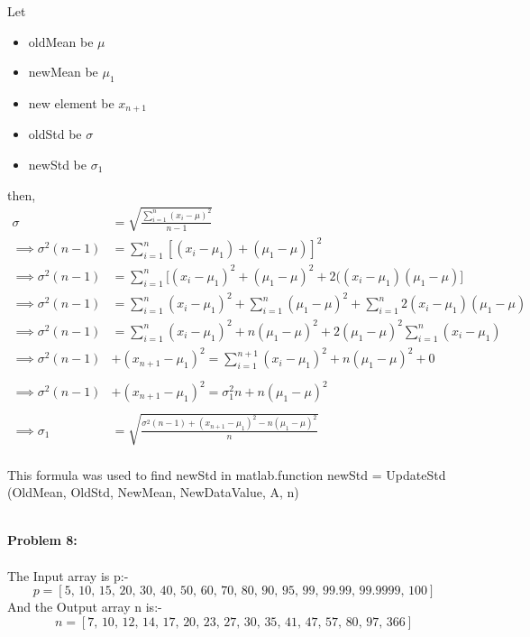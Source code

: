 \documentclass[a4paper]{article}
\begin{document}
\begin{itemize}
\qquad Let
\begin{itemize}
\item oldMean be $\mu$
\item newMean be $\mu_1$
\item new element be $x_{n+1}$
\item oldStd be $\sigma$
\item newStd be $\sigma_1$
\end{itemize}
\qquad then,
\begin{equation*}
\begin{split}
\sigma &=\sqrt{\frac{\sum_{i=1}^{n}(x_i-\mu)^2}{n-1}}\\
\implies \sigma^2(n-1)&={\sum_{i=1}^{n}[(x_i-\mu_1)+(\mu_1-\mu)]^2}\\
\implies \sigma^2(n-1) &={\sum_{i=1}^{n}\big[(x_i-\mu_1)^2+(\mu_1-\mu)^2+2((x_i-\mu_1)(\mu_1-\mu)\big]}\\
\implies \sigma^2(n-1) &={\sum_{i=1}^{n}(x_i-\mu_1)^2}+{\sum_{i=1}^{n}(\mu_1-\mu)^2}+{\sum_{i=1}^{n}2(x_i-\mu_1)(\mu_1-\mu)}\\
\implies \sigma^2(n-1)&={\sum_{i=1}^{n}(x_i-\mu_1)^2}+n(\mu_1-\mu)^2+2(\mu_1-\mu)^2{\sum_{i=1}^{n}(x_i-\mu_1)}\\
\implies \sigma^2(n-1)&+(x_{n+1}-\mu_1)^2=\sum_{i=1}^{n+1}(x_i-\mu_1)^2+n(\mu_1-\mu)^2+0\\\\
\implies \sigma^2(n-1)&+(x_{n+1}-\mu_1)^2=\sigma_1^2n+n(\mu_1-\mu)^2\\\\
\implies \sigma_1&=\sqrt{\frac{\sigma^2(n-1)+(x_{n+1}-\mu_1)^2-n(\mu_1-\mu)^2}{n}}\\
\end{split}
\end{equation*}

This formula was used to find newStd in matlab.function newStd = UpdateStd (OldMean, OldStd, NewMean, NewDataValue, A, n)
\end{itemize}

\hrulefill\\
\textbf{Problem 8:}\\
\\
The Input array is p:- 
$$p=[5,\, 10,\, 15,\, 20, \,30,\, 40, \,50,\, 60, \,70, \,80,\, 90,\, 95,\, 99,\, 99.99,\, 99.9999, \,100]$$
And the Output array n is:- 
$$n=[7,\, 10, \,12, \,14,\, 17, \,20,\, 23,\, 27,\, 30, \,35 ,\, 41,\, 47,\, 57,\, 80,\, 97,\, 366]$$

\hrulefill
\end{document}
